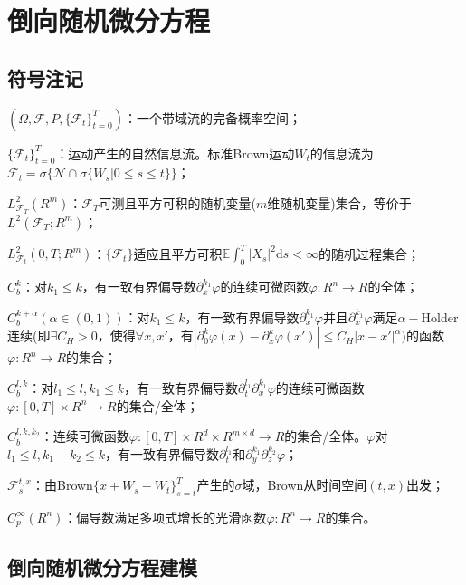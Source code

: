 % 
\chapter{倒向随机微分方程}\label{cha:bsde}
\section{符号注记}
	\par
	$(\Omega,\mathcal{F},P,\{\mathcal{F}_t\}_{t=0}^T)$：一个带域流的完备概率空间；
	\par
	$\{\mathcal{F}_t\}_{t=0}^T$：运动产生的自然信息流。标准Brown运动$W_t$的信息流为
	$\mathcal{F}_t = \sigma\{\mathcal{N} \cap\sigma\{W_s|0 \leqslant s \leqslant t\}\}$；
	\par
	$L_{\mathcal{F}_T}^2(R^m)$：$\mathcal{F}_T$可测且平方可积的随机变量($m$维随机变量)集合，等价于$L^2(\mathcal{F}_T;R^m)$；
	\par
	$L_{\mathcal{F}_t}^2(0,T;R^m)$：$\{\mathcal{F}_t\}$适应且平方可积$\mathbb{E}\int_0^T|X_s|^2\mathrm{d}s <\infty$的随机过程集合；
	\par
	$C_b^k$：对$k_1 \leqslant k$，有一致有界偏导数$\partial _x^{k_1}\varphi$的连续可微函数$\varphi:R^n\to R$的全体；
	\par
	$C_b^{k+\alpha}(\alpha\in (0,1))$：对$k_1 \leqslant k$，有一致有界偏导数$\partial _x^{k_1}\varphi$并且$\partial _x^{k_1}\varphi$满足$\alpha-$Holder连续(即$\exists C_H >0$，使得$\forall x,x'$，有$|\partial _0^{k}\varphi(x)-\partial _x^{k}\varphi(x')| \leqslant C_H|x-x'|^\alpha)$的函数$\varphi:R^n\to R$的集合；
	\par
	$C_b^{l,k}$：对$l_1 \leqslant l, k_1 \leqslant k$，有一致有界偏导数$\partial _t^{l_1}\partial _x^{k_1}\varphi$的连续可微函数$\varphi:[0,T]\times R^n\to R$的集合/全体；
	\par
	$C_b^{l,k,k_2}$：连续可微函数$\varphi:[0,T]\times R^d \times R^{m\times d}\to R$的集合/全体。$\varphi$对$l_1 \leqslant l, k_1 +k_2 \leqslant k$，有一致有界偏导数$\partial _t^{l_1}$和$\partial _y^{k_1}\partial _z^{k_2}\varphi$；
	\par
	$\mathcal{F}_s^{t,x}$：由Brown$\{x+W_s-W_t\}_{s=t}^T$产生的$\sigma$域，Brown从时间空间$(t,x)$出发；
	\par
	$C_p^\infty(R^n)$：偏导数满足多项式增长的光滑函数$\varphi:R^n\to R$的集合。


\section{倒向随机微分方程建模}
	\label{sec:de-bsde-modeling}
